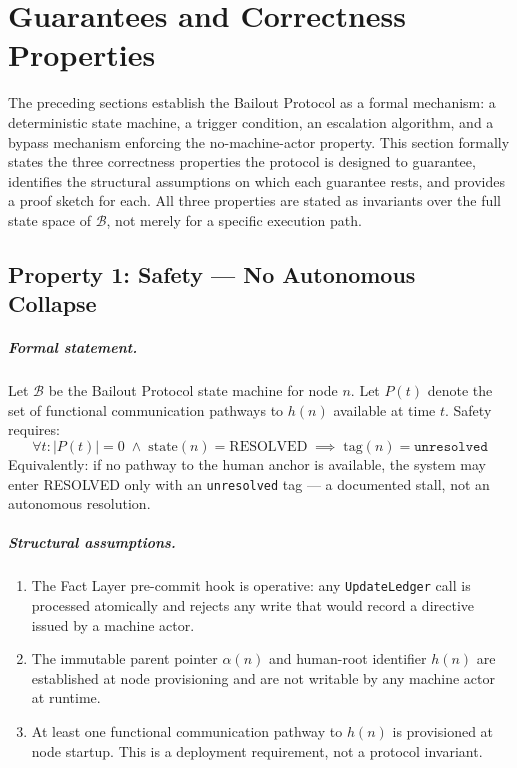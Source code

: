 \section{Guarantees and Correctness Properties}
\label{sec:correctness-properties}

The preceding sections establish the Bailout Protocol as a formal mechanism: a deterministic state machine, a trigger condition, an escalation algorithm, and a bypass mechanism enforcing the no-machine-actor property. This section formally states the three correctness properties the protocol is designed to guarantee, identifies the structural assumptions on which each guarantee rests, and provides a proof sketch for each. All three properties are stated as invariants over the full state space of $\mathcal{B}$, not merely for a specific execution path.

\subsection{Property 1: Safety — No Autonomous Collapse}


\subparagraph{Formal statement.} Let $\mathcal{B}$ be the Bailout Protocol state machine for node $n$. Let $P(t)$ denote the set of functional communication pathways to $h(n)$ available at time $t$. Safety requires:
\begin{equation}
\forall t : |P(t)| = 0 \;\land\; \text{state}(n) = \text{RESOLVED}
\;\implies\;
\text{tag}(n) = \texttt{unresolved}
\end{equation}
Equivalently: if no pathway to the human anchor is available, the system may enter RESOLVED only with an \texttt{unresolved} tag — a documented stall, not an autonomous resolution.

\subparagraph{Structural assumptions.}
\begin{enumerate}
\item[\textbf{A1.1}] The Fact Layer pre-commit hook is operative: any \texttt{UpdateLedger} call is processed atomically and rejects any write that would record a directive issued by a machine actor.
\item[\textbf{A1.2}] The immutable parent pointer $\alpha(n)$ and human-root identifier $h(n)$ are established at node provisioning and are not writable by any machine actor at runtime.
\item[\textbf{A1.3}] At least one functional communication pathway to $h(n)$ is provisioned at node startup. This is a deployment requirement, not a protocol invariant.
\end{enumerate}

